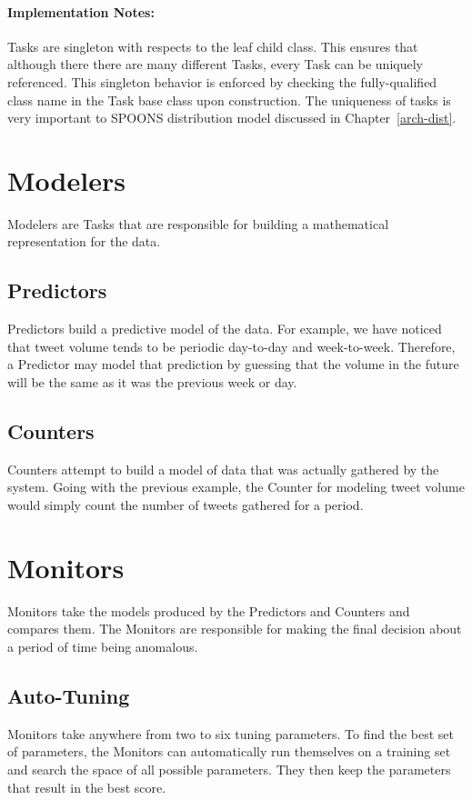 \documentclass[12pt]{ucthesis}
\begin{document}
\paragraph{Implementation Notes:}
Tasks are singleton with respects to the leaf child class.
This ensures that although there there are many different Tasks, every Task can be uniquely referenced.
This singleton behavior is enforced by checking the fully-qualified class name in the Task base class upon construction.
The uniqueness of tasks is very important to SPOONS distribution model discussed in Chapter~\ref{arch-dist}.

\section{Modelers}
\label{arch-modelers}
Modelers are Tasks that are responsible for building a mathematical representation for the data.

\subsection{Predictors}
\label{arch-predictors}
Predictors build a predictive model of the data. For example, we have noticed that tweet volume tends to be
periodic day-to-day and week-to-week. Therefore, a Predictor may model that prediction by guessing that the volume
in the future will be the same as it was the previous week or day.

\subsection{Counters}
\label{arch-counters}
Counters attempt to build a model of data that was actually gathered by the system. Going with the previous example,
the Counter for modeling tweet volume would simply count the number of tweets gathered for a period.

\section{Monitors}
\label{arch-monitors}
Monitors take the models produced by the Predictors and Counters and compares them. The Monitors are responsible for
making the final decision about a period of time being anomalous.

\subsection{Auto-Tuning}
\label{arch-autotuning}
Monitors take anywhere from two to six tuning parameters. To find the best set of parameters, the Monitors can
automatically run themselves on a training set and search the space of all possible parameters. They then keep the
parameters that result in the best score.
\end{document}
